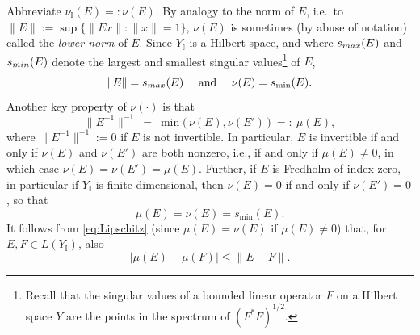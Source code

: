 \documentclass[preprint,1p,11pt]{elsarticle}
\newcommand\I{{\mathbb I}}
\numberwithin{equation}{section}   %
\numberwithin{figure}{section}  %
\begin{document}
 Abbreviate $\nu_\I(E)=:\nu(E)$. By analogy to the norm of $E$, i.e.\ to $\|E\|:= \sup\{\|Ex\|:\|x\|=1\}$, $\nu(E)$ is sometimes  (by abuse of notation) called the {\sl lower norm} %
 of $E$. Since $Y_\I$ is a Hilbert space, and where $s_{\rm max}(E)$ and $s_{\rm min}(E)$ denote the largest and smallest singular values\footnote{Recall that the singular values of a bounded linear operator $F$ on a Hilbert space $Y$ are the points in the spectrum of $(F^*F)^{1/2}$.} of $E$,
$$
\|E\|=s_{\rm max}(E) \quad \mbox{ and } \quad \nu(E)=s_{\rm \min}(E).
$$
Another key property of $\nu(\cdot)$ is that
\begin{equation} \label{eq:invnu}
\|E^{-1}\|^{-1}\ =\ \min\big(\,\nu(E),\nu(E')\,\big)\ =:\ \mu(E),
\end{equation}
where  $\|E^{-1}\|^{-1}:= 0$ if $E$ is not invertible. In particular, $E$ is invertible if and only if $\nu(E)$ and $\nu(E')$ are both nonzero, i.e., if and only if $\mu(E)\neq 0$, in which case
$\nu(E)=\nu(E')=\mu(E)$. Further, if $E$ is Fredholm of index zero, in particular if $Y_\I$ is finite-dimensional, then $\nu(E)=0$ if and only if $\nu(E')=0$, so that 
\begin{equation} \label{eq:munu}
\mu(E)=\nu(E)=s_{\min}(E).
\end{equation}
It follows from \eqref{eq:Lipschitz} (since $\mu(E)=\nu(E)$ if $\mu(E)\neq 0$) that, for $E,F\in L(Y_\I)$, also
\begin{equation} \label{eq:lnPro2}
|\mu(E)-\mu(F)|\leq \|E-F\|.
\end{equation}
\end{document}
